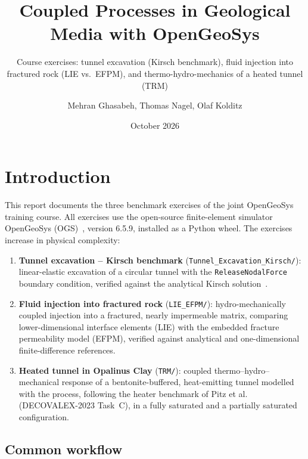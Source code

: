 \documentclass[11pt,a4paper]{tubaf-report}
\title[OGS Training Course -- Benchmark Exercises]{Coupled Processes in Geological Media with OpenGeoSys}
\subtitle{Course exercises: tunnel excavation (Kirsch benchmark),
  fluid injection into fractured rock (LIE vs.\ EFPM),
  and thermo-hydro-mechanics of a heated tunnel (TRM)
}
\author[Ghasabeh, Nagel, and Kolditz]{Mehran Ghasabeh, Thomas Nagel, Olaf Kolditz}
\date{October 2026}
\begin{document}
\maketitle
\tableofcontents
\clearpage

\chapter{Introduction}
\label{ch:intro}

This report documents the three benchmark exercises of the joint OpenGeoSys
training course. All exercises use the open-source finite-element simulator
OpenGeoSys (OGS)~\cite{bilke2019,kolditz2012,ogs-docs}, version 6.5.9,
installed as a Python wheel. The exercises increase in physical complexity:

\begin{enumerate}[nosep]
  \item \textbf{Tunnel excavation -- Kirsch benchmark}
        (\texttt{Tunnel\_Excavation\_Kirsch/}): linear-elastic excavation of a
        circular tunnel with the \texttt{ReleaseNodalForce} boundary
        condition, verified against the analytical Kirsch
        solution~\cite{kirsch1898}.
  \item \textbf{Fluid injection into fractured rock}
        (\texttt{LIE\_EFPM/}): hydro-mechanically coupled injection into a
        fractured, nearly impermeable matrix, comparing lower-dimensional
        interface elements (LIE) with the embedded fracture permeability
        model (EFPM), verified against analytical and one-dimensional
        finite-difference references.
  \item \textbf{Heated tunnel in Opalinus Clay}
        (\texttt{TRM/}): coupled thermo--hydro--mechanical response of a
        bentonite-buffered, heat-emitting tunnel modelled with the
         process, following the heater
        benchmark of Pitz et al.~\cite{pitz2023} (DECOVALEX-2023 Task~C), in a
        fully saturated and a partially saturated configuration.
\end{enumerate}

\section{Common workflow}
\end{document}
